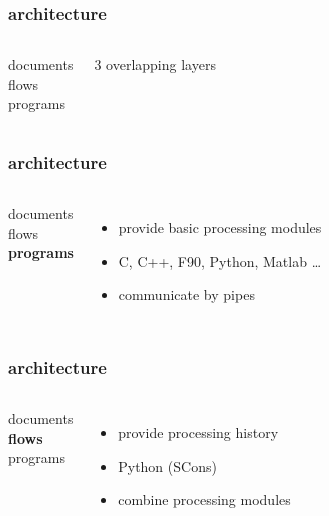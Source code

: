 \begin{frame} \frametitle{\mg architecture}

  \begin{columns}
    documents \\
    \vspace{0.25in}
    flows \\
    \vspace{0.25in}
    programs

    $3$ overlapping layers

  \end{columns}

\end{frame}
\cwpnote{}

\begin{frame} \frametitle{\mg architecture}

  \begin{columns}
    documents \\
    \vspace{0.25in}
    flows \\
    \vspace{0.25in}
    \textbf{programs}

    \begin{itemize}
    \item provide basic processing modules
    \item C, C++, F90, Python, Matlab \dots
    \item communicate by pipes
    \end{itemize}

  \end{columns}

\end{frame}
\cwpnote{}

\begin{frame} \frametitle{\mg architecture}

  \begin{columns}
    documents \\
    \vspace{0.25in}
    \textbf{flows} \\
    \vspace{0.25in}
    programs

    \begin{itemize}
    \item provide processing history
    \item Python (SCons)
    \item combine processing modules
    \end{itemize}

  \end{columns}

\end{frame}
\cwpnote{}

